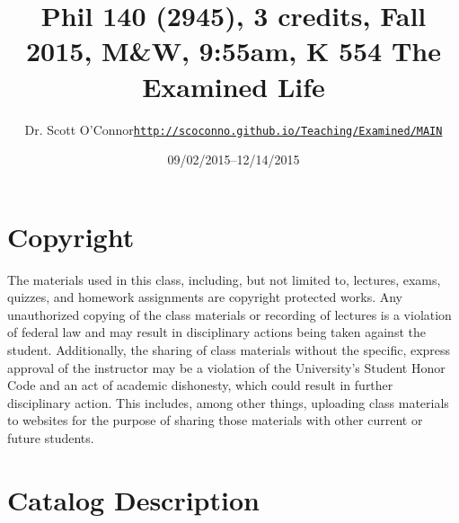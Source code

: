 \documentclass[article,oneside]{memoir}
\def\myauthor{Author}
\def\mytitle{Title}
\def\mycopyright{\myauthor}
\def\myweb{\href{http://scoconno.github.io/Teaching/Examined/MAIN}{http://scoconno.github.io/Teaching/Examined/MAIN}}
\def\myauthor{Dr. Scott O'Connor}
\def\mytitle{{\normalsize Phil 140 (2945), 3 credits, Fall 2015, M\&W, 9:55am, K 554\newline} \HUGE The Examined Life}
\begin{document}
\setsansfont[Mapping=tex-text]{Georgia} 
\setmonofont[Mapping=tex-text,Scale=0.8]{Georgia} 

\def\ind{\hangindent=1 true cm\hangafter=1 \noindent}
\def\labelitemi{$\cdot$}

\pagestyle{kjh}

\title{\LARGE \mytitle}     
\author{\Large\myauthor \newline \footnotesize\texttt{\noindent\myweb}}
\date{09/02/2015--12/14/2015}

\published{\,}

\maketitle




%
%

\section{Copyright}
The materials used in this class, including, but not limited to, lectures, exams, quizzes, and homework assignments are copyright protected works.  Any unauthorized copying of the class materials or recording of lectures is a violation of federal law and may result in disciplinary actions being taken against the student.  Additionally, the sharing of class materials without the specific, express approval of the instructor may be a violation of the University's Student Honor Code and an act of academic dishonesty, which could result in further disciplinary action.  This includes, among other things, uploading class materials to websites for the purpose of sharing those materials with other current or future students. 

\section{Catalog Description}
\end{document}
